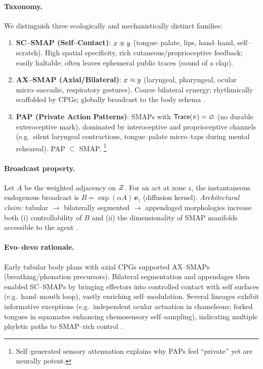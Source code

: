\paragraph{Taxonomy.}
We distinguish three ecologically and mechanistically distinct families:
\begin{enumerate}
  \item \textbf{SC–SMAP (Self–Contact)}: $x \mathrel{\circledast} y$ (tongue–palate, lips, hand–hand, self–scratch). High spatial specificity, rich cutaneous/proprioceptive feedback; easily haltable; often leaves ephemeral public traces (sound of a clap).
  \item \textbf{AX–SMAP (Axial/Bilateral)}: $x \mathrel{\approx} y$ (laryngeal, pharyngeal, ocular micro–saccadic, respiratory gestures). Coarse bilateral synergy; rhythmically scaffolded by CPGs; globally broadcast to the body schema \citep{Kelso1995DynamicPatterns}.
  \item \textbf{PAP (Private Action Patterns)}: SMAPs with $\mathsf{Trace}(\pi)=\varnothing$ (no durable exteroceptive mark), dominated by interoceptive and proprioceptive channels (e.g.\ silent laryngeal contractions, tongue–palate micro–taps during mental rehearsal). PAP $\subset$ SMAP.%
  \footnote{Self–generated sensory attenuation \citep{BlakemoreWolpertFrith1998Tickle} explains why PAPs feel “private” yet are neurally potent.}
\end{enumerate}

\paragraph{Broadcast property.}
Let $A$ be the weighted adjacency on $\mathcal{Z}$. For an act at zone $z$, the instantaneous endogenous broadcast is $B=\exp(\alpha A)\,\mathbf{e}_z$ (diffusion kernel). \emph{Architectural claim:} tubular $\rightarrow$ bilaterally segmented $\rightarrow$ appendaged morphologies increase both (i) controllability of $B$ and (ii) the dimensionality of SMAP manifolds accessible to the agent \citep{ThelenSmith1994Dynamics,Carroll2005EndlessForms}.

\paragraph{Evo–devo rationale.}
Early tubular body plans with axial CPGs supported AX–SMAPs (breathing/phonation precursors). Bilateral segmentation and appendages then enabled SC–SMAPs by bringing effectors into controlled contact with self surfaces (e.g.\ hand–mouth loop), vastly enriching self–modulation. Several lineages exhibit informative exceptions (e.g.\ independent ocular actuation in chameleons; forked tongues in squamates enhancing chemosensory self–sampling), indicating multiple phyletic paths to SMAP–rich control \citep{LandNilsson2012AnimalEyes,Schwenk1994ForkedTongues}.

